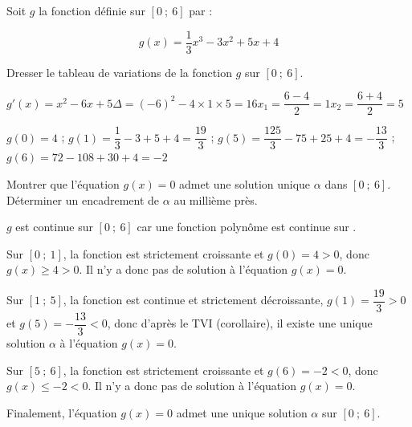 \documentclass[11pt,a4paper]{article}  %
\begin{document}

Soit $g$ la fonction définie sur $[0\ ;\ 6]$ par :

$$
g(x)=\frac{1}{3} x^3-3x^2+5x+4
$$

\begin{enumMet}
	\item Dresser le tableau de variations de la fonction $g$ sur $[0\ ;\ 6]$.
	\begin{corrBox}
		$g'(x)=x^2-6x+5$\quad \quad \quad \quad $\Delta=(-6)^2-4\times 1\times 5=16$\quad \quad \quad \quad $x_1=\dfrac{6-4}{2}=1$\quad \quad \quad \quad $x_2=\dfrac{6+4}{2}=5$

		$g(0)=4$ \quad ; \quad $g(1)=\dfrac{1}{3}-3+5+4=\dfrac{19}{3}$ \quad ; \quad $g(5)=\dfrac{125}{3}-75+25+4=-\dfrac{13}{3}$ \quad ; \quad $g(6)=72-108+30+4=-2$

		\begin{center}
		\end{center}
	\end{corrBox}
	\item Montrer que l'équation $g(x)=0$ admet une solution unique $\alpha$ dans $[0\ ;\ 6]$. Déterminer un encadrement de $\alpha$ au millième près.
	\begin{corrBox}
		$g$ est continue sur $[0\ ;\ 6]$ car une fonction polynôme est continue sur \R.

		\begin{itemMet}
			\item Sur $[0\ ;\ 1]$, la fonction est strictement croissante et $g(0)=4>0$, donc $g(x)\geqslant 4>0$. Il n'y a donc pas de solution à l'équation $g(x)=0$.
			\item Sur $[1\ ;\ 5]$, la fonction est continue et strictement décroissante, $g(1)=\dfrac{19}{3}>0$ et $g(5)=-\dfrac{13}{3}<0$, donc d'après le TVI (corollaire), il existe une unique solution $\alpha$ à l'équation $g(x)=0$.
			\item Sur $[5\ ;\ 6]$, la fonction est strictement croissante et $g(6)=-2<0$, donc $g(x)\leqslant -2<0$. Il n'y a donc pas de solution à l'équation $g(x)=0$.
		\end{itemMet}

		Finalement, l'équation $g(x)=0$ admet une unique solution $\alpha$ sur $[0\ ;\ 6]$.


\end{corrBox}
\end{enumMet}
\end{document}
